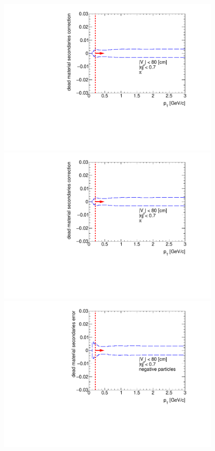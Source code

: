 \begin{figure}[hb]
{  \includegraphics[width=\linewidth,page=5]{graphics/systematicsEfficiency/deadMaterial/secondaries_Unbinned_SDCD_1D.pdf}\\
  \includegraphics[width=\linewidth,page=6]{graphics/systematicsEfficiency/deadMaterial/secondaries_Unbinned_SDCD_1D.pdf}\\
  \includegraphics[width=\linewidth,page=2]{graphics/systematicsEfficiency/deadMaterial/secondaries_Unbinned_Charged_SDCD1D.pdf}
}%
\end{figure}



